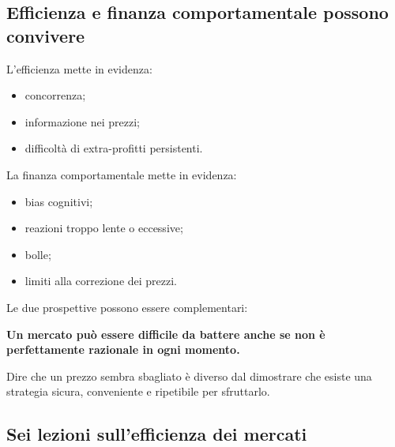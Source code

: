 \subsection{Efficienza e finanza comportamentale
possono convivere}

\noindent L'efficienza mette in evidenza:

\begin{itemize}
    \item concorrenza;
    \item informazione nei prezzi;
    \item difficoltà di extra-profitti persistenti.
\end{itemize}

\noindent La finanza comportamentale
mette in evidenza:

\begin{itemize}
    \item bias cognitivi;
    \item reazioni troppo lente o eccessive;
    \item bolle;
    \item limiti alla correzione dei prezzi.
\end{itemize}

\medskip

\noindent Le due prospettive
possono essere complementari:

\begin{center}
    \textbf{Un mercato può essere difficile
    da battere anche se non è perfettamente
    razionale in ogni momento.}
\end{center}

\noindent Dire che un prezzo sembra sbagliato
è diverso dal dimostrare che esiste
una strategia sicura, conveniente
e ripetibile per sfruttarlo.


\subsection{Sei lezioni sull'efficienza dei mercati}

